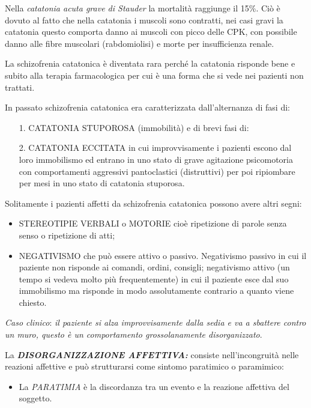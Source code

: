 \begin{itemize}
Nella \emph{\emph{catatonia acuta grave di Stauder}} la mortalità
raggiunge il 15\%. Ciò è dovuto al fatto che nella catatonia i muscoli
sono contratti, nei casi gravi la catatonia questo comporta danno ai
muscoli con picco delle CPK, con possibile danno alle fibre muscolari
(rabdomiolisi) e morte per insufficienza renale.

La schizofrenia catatonica è diventata rara perché la catatonia risponde
bene e subito alla terapia farmacologica per cui è una forma che si vede
nei pazienti non trattati.

In passato schizofrenia catatonica era caratterizzata dall'alternanza di
fasi di:

\begin{itemize}
\item[1.]
  CATATONIA STUPOROSA (immobilità) e di brevi fasi di:
\item[2.]
  CATATONIA ECCITATA in cui improvvisamente i pazienti escono dal loro
  immobilismo ed entrano in uno stato di grave agitazione psicomotoria
  con comportamenti aggressivi pantoclastici (distruttivi) per poi
  ripiombare per mesi in uno stato di catatonia stuporosa.
\end{itemize}

Solitamente i pazienti affetti da schizofrenia catatonica possono avere
altri segni:

\begin{itemize}
\item
  STEREOTIPIE VERBALI o MOTORIE cioè ripetizione di parole senza senso o
  ripetizione di atti;
\item
  NEGATIVISMO che può essere attivo o passivo. Negativismo passivo in
  cui il paziente non risponde ai comandi, ordini, consigli; negativismo
  attivo (un tempo si vedeva molto più frequentemente) in cui il
  paziente esce dal suo immobilismo ma risponde in modo assolutamente
  contrario a quanto viene chiesto.
\end{itemize}

\emph{Caso clinico}: \emph{il paziente si alza improvvisamente dalla
sedia e va a sbattere contro un muro, questo è un comportamento
grossolanamente disorganizzato}.

La \textbf{\emph{DISORGANIZZAZIONE AFFETTIVA:}} consiste
nell'incongruità nelle reazioni affettive e può strutturarsi come
sintomo paratimico o paramimico:

\begin{itemize}
\item
  La \emph{PARATIMIA} è la discordanza tra un evento e la reazione
  affettiva del soggetto.


\end{itemize}
\end{itemize}
